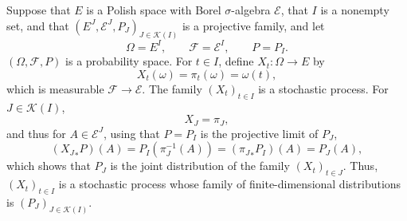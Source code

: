 \documentclass{article}
\theoremstyle{definition}
\begin{document}
Suppose that $E$ is a Polish space with Borel $\sigma$-algebra $\mathscr{E}$, that
$I$ is a nonempty set,
and that $(E^J,\mathscr{E}^J,P_J)_{J \in \mathscr{K}(I)}$ is a projective family,
and let
\[
\Omega = E^I,\qquad \mathscr{F}= \mathscr{E}^I,\qquad P = P_I.
\]
$(\Omega,\mathscr{F},P)$ is a probability space.
For $t \in I$, define $X_t:\Omega \to E$ by
\[
X_t(\omega) = \pi_t(\omega) = \omega(t),
\]
which is measurable $\mathscr{F} \to \mathscr{E}$.
The family $(X_t)_{t \in I}$ is a stochastic process. For $J \in \mathscr{K}(I)$,
\[
X_J = \pi_J,
\]
 and thus for $A \in \mathscr{E}^J$, using that $P=P_I$ is the projective limit of $P_J$,
\[
({X_J}_*P)(A)= P_I(\pi_J^{-1}(A)) = ({\pi_J}_* P_I)(A) = P_J(A),
\]
which shows that $P_J$ is the joint distribution of the family $(X_t)_{t \in J}$. 
Thus, $(X_t)_{t \in I}$ is a stochastic process whose family of finite-dimensional distributions is
$(P_J)_{J \in \mathscr{K}(I)}$. 
\end{document}
